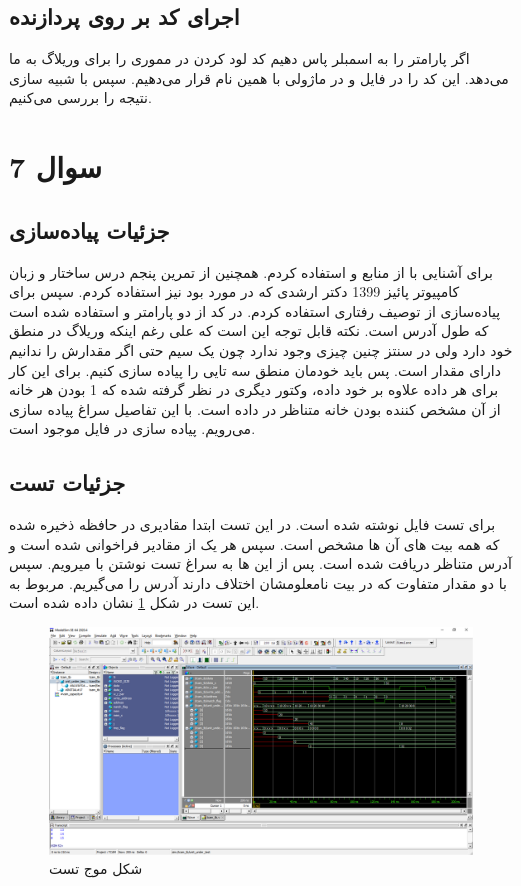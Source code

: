 \documentclass{article}
\begin{document}
\subsection{اجرای کد بر روی پردازنده}
اگر پارامتر 
را به اسمبلر پاس دهیم کد لود کردن در مموری را برای وریلاگ به ما می‌دهد. این کد را در فایل 
و در ماژولی با همین نام قرار می‌دهیم. سپس با شبیه سازی نتیجه را بررسی می‌کنیم.

\section{سوال 7}
\subsection{جزئیات پیاده‌سازی}
برای آشنایی با  
از منابع 
\cite{tcam-searchnetworking}
و
\cite{tcam-wikipedia}
استفاده کردم. همچنین از تمرین پنجم درس ساختار و زبان کامپیوتر پائیز 1399 دکتر ارشدی که در مورد 
بود نیز استفاده کردم. سپس برای پیاده‌سازی از توصیف رفتاری استفاده کردم. در کد از دو پارامتر 
و 
استفاده شده است که 
طول آدرس است. نکته قابل توجه این است که علی رغم اینکه وریلاگ در منطق خود 
دارد ولی در سنتز چنین چیزی وجود ندارد چون یک سیم حتی اگر مقدارش را ندانیم دارای مقدار است. 
پس باید خودمان منطق سه تایی را پیاده سازی کنیم. برای این کار برای هر داده علاوه بر خود داده، 
وکتور دیگری در نظر گرفته شده که 1 بودن هر خانه از آن مشخص کننده 
بودن خانه متناظر در داده است. با این تفاصیل سراغ پیاده سازی می‌رویم. پیاده سازی در فایل 
موجود است.

\subsection{جزئیات تست}
برای تست فایل 
نوشته شده است. در این تست ابتدا مقادیری در حافظه ذخیره شده که همه بیت های آن ها مشخص است. 
سپس هر یک از مقادیر فراخوانی شده است و آدرس متناظر دریافت شده است. پس از این ها به سراغ تست نوشتن با 
میرویم. سپس با دو مقدار متفاوت که در بیت نامعلومشان اختلاف دارند آدرس را می‌گیریم. 
مربوط به این تست در شکل 
\ref{tcam-wave}
نشان داده شده است.

\begin{figure}[!htbp]
	\centering
	\includegraphics[width=\linewidth]{tcam_tb_wave.png}
	\caption{شکل موج تست }
	\label{tcam-wave}
\end{figure}
\end{document}
